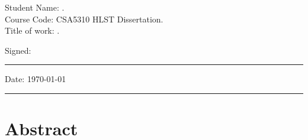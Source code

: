 \vspace{3cm}

\noindent Student Name: \ThesisAuthor.\\
Course Code: CSA5310 HLST Dissertation.\\
Title of work: \ThesisTitle.\\
\vspace{3cm}

\noindent Signed:\\
\rule[0.5em]{25em}{0.5pt}
 
\noindent Date: \qquad \today\\
\rule[0.5em]{25em}{0.5pt}

\newpage


\chapter*{Abstract}


\Abstract
